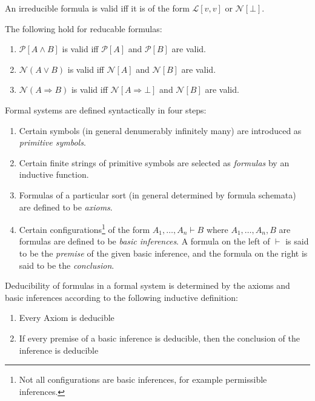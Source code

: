 \documentclass[nobib,notoc]{tufte-handout}
\begin{document}
\begin{thm}
	An irreducible formula is valid iff it is of the form \(\mathscr{L}[v,v]\) or \(\mathscr{N}[\bot]\).
\end{thm}
\begin{thm}
	The following hold for reducable formulas:
	\begin{enumerate}
		\item \(\mathscr{P}[A\wedge B]\) is valid iff \(\mathscr{P}[A]\) and \(\mathscr{P}[B]\) are valid.
		\item \(\mathscr{N}(A\vee B)\) is valid iff \(\mathscr{N}[A]\) and \(\mathscr{N}[B]\) are valid.
		\item \(\mathscr{N}(A\Rightarrow B)\) is valid iff \(\mathscr{N}[A\Rightarrow\bot]\) and \(\mathscr{N}[B]\) are valid.
	\end{enumerate}
\end{thm}
\begin{defi}
	Formal systems are defined syntactically in four steps:
	\begin{enumerate}
		\item Certain symbols (in general denumerably infinitely many) are introduced as \emph{primitive symbols}.
		\item Certain finite strings of primitive symbols are selected as \emph{formulas} by an inductive function.
		\item Formulas of a particular sort (in general determined by formula schemata) are defined to be \emph{axioms}.
		\item Certain configurations\footnote{Not all configurations are basic inferences, for example permissible inferences.} of the form \(A_1,\ldots,A_n\vdash B\) where \(A_1,\ldots,A_n,B\) are formulas are defined to be \emph{basic inferences}. A formula on the left of \(\vdash\) is said to be the \emph{premise} of the given basic inference, and the formula on the right is said to be the \emph{conclusion}.
	\end{enumerate}
\end{defi}
\begin{defi}
	Deducibility of formulas in a formal system is determined by the axioms and basic inferences according to the following inductive definition:
	\begin{enumerate}
		\item Every Axiom is deducible
		\item If every premise of a basic inference is deducible, then the conclusion of the inference is deducible
	\end{enumerate}
\end{defi}
\end{document}
